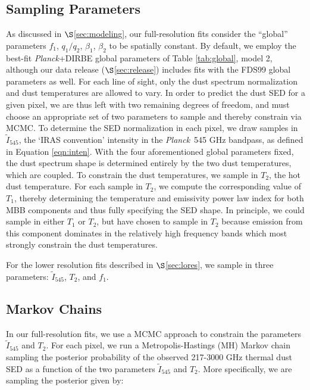 \documentclass{emulateapj}
\newcommand{\PLANCK}{{\it Planck}}
\begin{document}
\subsection{Sampling Parameters}
\label{sec:samp}
As discussed in $\S$\ref{sec:modeling}, our full-resolution fits
consider the ``global'' parameters $f_1$, $q_1/q_2$, $\beta_1$, $\beta_2$ to be
spatially constant. By default, we employ the best-fit \PLANCK+DIRBE global 
parameters of Table \ref{tab:global}, model 2, although our data release 
($\S$\ref{sec:release}) includes fits with the FDS99 global parameters as well.
For each line of sight, only the dust spectrum normalization and dust 
temperatures are allowed to vary. In order to predict the dust SED for a given 
pixel, we are thus left with two remaining degrees of freedom, and must choose 
an appropriate set of two parameters to sample and thereby constrain via MCMC. 
To determine the SED normalization in each pixel, we draw samples in 
$\tilde{I}_{545}$, the `IRAS convention' intensity in the \PLANCK~545 GHz 
bandpass, as defined in Equation \ref{eqn:inten}. With the four aforementioned 
global parameters fixed, the dust spectrum shape is determined entirely by the 
two dust temperatures, which are coupled. To constrain the dust temperatures, 
we sample in $T_2$, the hot dust temperature. For each sample in $T_2$, we 
compute the corresponding value of $T_1$, thereby determining the temperature 
and emissivity power law index for both MBB components and thus fully 
specifying the SED shape. In principle, we could sample in either $T_1$ or 
$T_2$, but have chosen to sample in $T_2$ because emission from this component 
dominates in the relatively high frequency bands which most strongly constrain 
the dust temperatures.

For the lower resolution fits described in $\S$\ref{sec:lores}, we sample
in three parameters: $\tilde{I}_{545}$, $T_2$, and $f_1$.


\subsection{Markov Chains}
\label{sec:mcmc}

In our full-resolution fits, we use a MCMC approach to constrain the 
parameters $\tilde{I}_{545}$ and $T_2$. For each pixel, we run a 
Metropolis-Hastings (MH) Markov chain sampling the posterior probability of
the observed 217-3000 GHz thermal dust SED as a function of the two parameters 
$\tilde{I}_{545}$ and $T_2$. More specifically, we are sampling the posterior 
given by:
\end{document}
